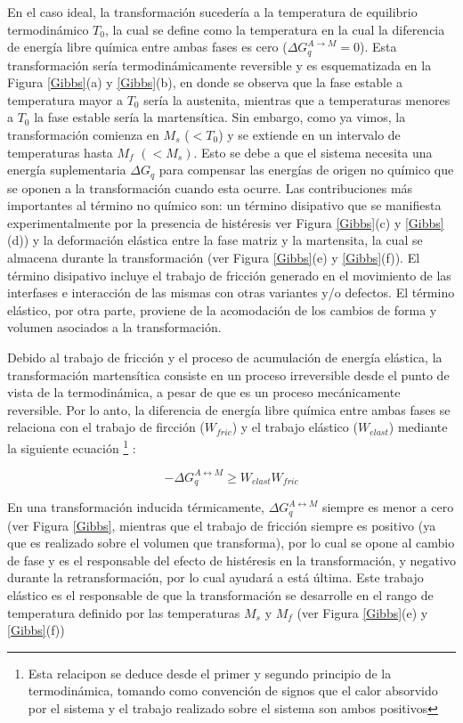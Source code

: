 \documentclass[12pt]{article}
\theoremstyle{definition}
\theoremstyle{remark}
\begin{document}
En el caso ideal, la transformación sucedería a la temperatura de equilibrio termodinámico $T_0$, la cual se define como la temperatura en la cual la diferencia de energía libre química entre ambas fases es cero ($\Delta G^{A \rightarrow M}_q = 0$). Esta transformación sería termodinámicamente reversible y es esquematizada en la Figura \ref{Gibbs}(a) y \ref{Gibbs}(b), en donde se observa que la fase estable a temperatura mayor a $T_0$ sería la austenita, mientras que a temperaturas menores a $T_0$ la fase estable sería la martensítica. Sin embargo, como ya vimos, la transformación comienza en $M_s$  ($< T_0$) y se extiende en un intervalo de temperaturas hasta $M_f$  $(< M_s)$. Esto se debe a que el sistema necesita una energía suplementaria $\Delta G_q$ para compensar las energías de origen no químico que se oponen a la transformación cuando esta ocurre. Las contribuciones más importantes al término no químico son: un término disipativo que se manifiesta experimentalmente por la presencia de histéresis ver Figura \ref{Gibbs}(c) y \ref{Gibbs}(d)) y la deformación elástica entre la fase matriz y la martensita, la cual se almacena durante la transformación (ver Figura \ref{Gibbs}(e) y \ref{Gibbs}(f)). El término disipativo incluye el trabajo de fricción generado en el movimiento de las interfases e interacción de las mismas con otras variantes y/o defectos. El término elástico, por otra parte, proviene de la acomodación de los cambios de forma y volumen asociados a la transformación\cite{Wollants1993}.

Debido al trabajo de fricción y el proceso de acumulación de energía elástica, la
transformación martensítica consiste en un proceso irreversible desde el punto de vista de la termodinámica, a pesar de que es un proceso mecánicamente reversible. Por lo anto, la diferencia de energía libre química entre ambas fases se relaciona con el trabajo de fircción ($W_{fric}$) y el trabajo elástico ($W_{elast}$) mediante la siguiente ecuación \footnote{Esta relacipon se deduce desde el primer y segundo principio de la termodinámica, tomando como convención de signos que el calor absorvido por el sistema y el trabajo realizado sobre el sistema son ambos positivos} \cite{Isola2020}:

\begin{equation}
	- \Delta G_{q}^{A \leftrightarrow M} \geq W_{elast} W_{fric}
\end{equation}

En una transformación inducida térmicamente, $\Delta G_{q}^{A \leftrightarrow M}$ siempre es menor a cero (ver Figura \ref{Gibbs}, mientras que el trabajo de fricción siempre es positivo (ya que es realizado sobre el volumen que transforma), por lo cual se opone al cambio de fase y es el responsable del efecto de histéresis en la transformación, y negativo durante la retransformación, por lo cual ayudará a está última. Este trabajo elástico es el responsable de que la transformación se desarrolle en el rango de temperatura definido por las temperaturas $M_s$ y $M_f$ (ver Figura \ref{Gibbs}(e) y \ref{Gibbs}(f)) 
\end{document}
